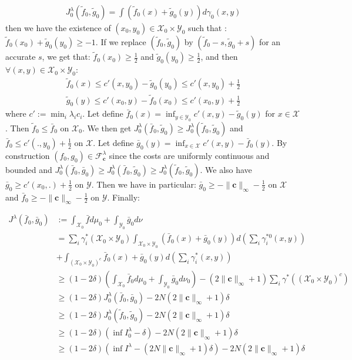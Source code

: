 \begin{prv*}
\begin{align*}
J_0^\lambda(\tilde{f}_0,\tilde{g}_0) = \int (\tilde{f}_0(x)+\tilde{g}_0(y))d\gamma_0(x,y)
\end{align*}
then we have the existence of $(x_0,y_0)\in\mathcal{X}_0\times\mathcal{Y}_0$ such that : $\tilde{f}_0(x_0)+\tilde{g}_0(y_0)\geq -1$. If we replace $(\tilde{f}_0,\tilde{g}_0)$ by $(\tilde{f}_0-s,\tilde{g}_0+s)$ for an accurate $s$, we get that: $\tilde{f}_0(x_0)\geq \frac12$
and $\tilde{g}_0(y_0)\geq \frac12$, and then $\forall(x,y)\in\mathcal{X}_0\times\mathcal{Y}_0$:
\begin{align*}
    \tilde{f}_0(x)\leq c'(x,y_0)-\tilde{g}_0(y_0)\leq c'(x,y_0)+\frac12\\
    \tilde{g}_0(y)\leq c'(x_0,y)-\tilde{f}_0(x_0)\leq c'(x_0,y)+\frac12
\end{align*}
where $c':=\min_i\lambda_ic_i$.  Let define $\bar{f}_0(x) = \inf_{y\in\mathcal{Y}_0}c'(x,y)-\tilde{g}_0(y)$ for $x\in\mathcal{X}$.  Then $\tilde{f}_0\leq \bar{f}_0$ on $\mathcal{X}_0$. We then get $J_0^\lambda(\bar{f}_0,\tilde{g}_0)\geq J_0^\lambda(\tilde{f}_0,\tilde{g}_0)$ and $\bar{f}_0\leq c'(.,y_0)+\frac12$ on $\mathcal{X}$. Let define $\bar{g}_0(y)= \inf_{x\in\mathcal{X}}c'(x,y)-\bar{f}_0(y)$. By construction $(f_0,g_0)\in \mathcal{F}
^\lambda_\mathbf{c}$ since the costs are uniformly continuous and bounded and $J_0^\lambda(\bar{f}_0,\bar{g}_0)\geq J_0^\lambda(\bar{f}_0,\tilde{g}_0)\geq J_0^\lambda(\tilde{f}_0,\tilde{g}_0)$. We also have  $\bar{g}_0\geq c'(x_0,.)+\frac12$ on $\mathcal{Y}$. Then we have in particular: $\bar{g}_0\geq -\lVert\mathbf{c}\rVert_\infty-\frac12$ on $\mathcal{X}$ and $\bar{f}_0\geq -\lVert\mathbf{c}\rVert_\infty-\frac12$ on $\mathcal{Y}$. Finally:

\begin{align*}
J^\lambda(\bar{f}_0,\bar{g}_0)&:=\int_{\mathcal{X}_0}\bar{f}d\mu_0+\int_{\mathcal{Y}_0}\bar{g}_0d\nu\\
&=\sum_i\gamma_i^*(\mathcal{X}_0\times\mathcal{Y}_0)\int_{\mathcal{X}_0\times\mathcal{Y}_0}(\bar{f}_0(x)+\bar{g}_0(y))d\left(\sum_i\gamma^{*0}_i(x,y)\right)\\
&+\int_{(\mathcal{X}_0\times\mathcal{Y}_0)^c}\bar{f}_0(x)+\bar{g}_0(y)d\left(\sum_i\gamma^{*}_i(x,y)\right)\\
&\geq (1-2\delta)\left(\int_{\mathcal{X}_0}\bar{f}_0d\mu_0+\int_{\mathcal{Y}_0}\bar{g}_0d\nu_0\right)-(2\lVert\mathbf{c}\rVert_\infty+1)\sum_i\gamma^*((\mathcal{X}_0\times\mathcal{Y}_0)^c)\\
&\geq (1-2\delta)J_0^\lambda(\bar{f}_0,\bar{g}_0)-2N(2\lVert\mathbf{c}\rVert_\infty+1)\delta\\
&\geq (1-2\delta)J_0^\lambda(\tilde{f}_0,\tilde{g}_0)-2N(2\lVert\mathbf{c}\rVert_\infty+1)\delta\\
&\geq (1-2\delta)(\inf I^\lambda_0-\delta)-2N(2\lVert\mathbf{c}\rVert_\infty+1)\delta\\
&\geq  (1-2\delta)(\inf I^\lambda-(2N\lVert\mathbf{c}\rVert_\infty+1)\delta)-2N(2\lVert\mathbf{c}\rVert_\infty+1)\delta
\end{align*}


\end{prv*}
